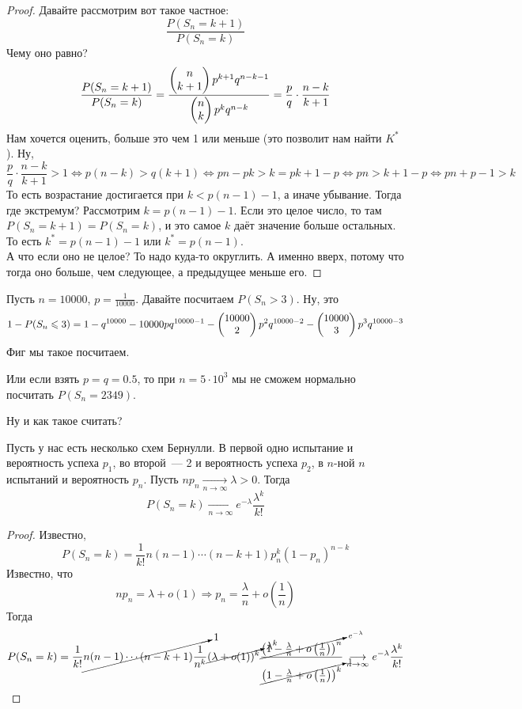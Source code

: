 \documentclass{article}
\begin{document}
    \begin{proof}
        Давайте рассмотрим вот такое частное:
        $$
        \frac{P(S_n=k+1)}{P(S_n=k)}
        $$
        Чему оно равно?
        $$
        \frac{P(S_n=k+1)}{P(S_n=k)}=\frac{\left(\begin{matrix}n\\k+1\end{matrix}\right)p^{k+1}q^{n-k-1}}{\left(\begin{matrix}n\\k\end{matrix}\right)p^kq^{n-k}}=\frac pq\cdot\frac{n-k}{k+1}
        $$
        Нам хочется оценить, больше это чем 1 или меньше (это позволит нам найти $K^*$). Ну,
        $$
        \frac pq\cdot\frac{n-k}{k+1}>1\Leftrightarrow p(n-k)>q(k+1)\Leftrightarrow pn-pk>k=pk+1-p\Leftrightarrow pn>k+1-p\Leftrightarrow pn+p-1>k
        $$
        То есть возрастание достигается при $k<p(n-1)-1$, а иначе убывание. Тогда где экстремум? Рассмотрим $k=p(n-1)-1$. Если это целое число, то там $P(S_n=k+1)=P(S_n=k)$, и это самое $k$ даёт значение больше остальных. То есть $k^*=p(n-1)-1$ или $k^*=p(n-1)$.\\
        А что если оно не целое? То надо куда-то округлить. А именно вверх, потому что тогда оно больше, чем следующее, а предыдущее меньше его.
    \end{proof}
    \begin{example}
        Пусть $n=10000$, $p=\frac1{10000}$. Давайте посчитаем $P(S_n>3)$. Ну, это
        $$
        1-P(S_n\leqslant 3)=1-q^{10000}-10000pq^{10000-1}-\left(\begin{matrix}10000\\2\end{matrix}\right)p^2q^{10000-2}-\left(\begin{matrix}10000\\3\end{matrix}\right)p^3q^{10000-3}
        $$
        Фиг мы такое посчитаем.
    \end{example}
    \begin{example}
        Или если взять $p=q=0.5$, то при $n=5\cdot10^3$ мы не сможем нормально посчитать $P(S_n=2349)$.
    \end{example}
    \begin{remark}
        Ну и как такое считать?
    \end{remark}
    \begin{theorem}
        Пусть у нас есть несколько схем Бернулли. В первой одно испытание и вероятность успеха $p_1$, во второй~--- 2 и вероятность успеха $p_2$, в $n$-ной $n$ испытаний и вероятность $p_n$. Пусть $np_n\underset{n\to\infty}\longrightarrow\lambda>0$. Тогда
        $$
        P(S_n=k)\underset{n\to\infty}\longrightarrow e^{-\lambda}\frac{\lambda^k}{k!}
        $$
    \end{theorem}
    \begin{proof}
        Известно,
        $$
        P(S_n=k)=\frac1{k!}n(n-1)\cdots(n-k+1)p_n^k(1-p_n)^{n-k}
        $$
        Известно, что
        $$
        np_n=\lambda+o(1)\Rightarrow p_n=\frac\lambda n+o\left(\frac1n\right)
        $$
        Тогда
        $$
        P(S_n=k)=\frac1{k!}\cancelto1{n(n-1)\cdots(n-k+1)\frac1{n^k}}\cancelto{\lambda^k}{(\lambda+o(1))^k}\frac{\cancelto{e^{-\lambda}}{\left(1-\frac\lambda n+o\left(\frac1n\right)\right)^n}}{\cancelto1{\left(1-\frac\lambda n+o\left(\frac1n\right)\right)^k}}\underset{n\to\infty}\longrightarrow e^{-\lambda}\frac{\lambda^k}{k!}
        $$
    \end{proof}
\end{document}

